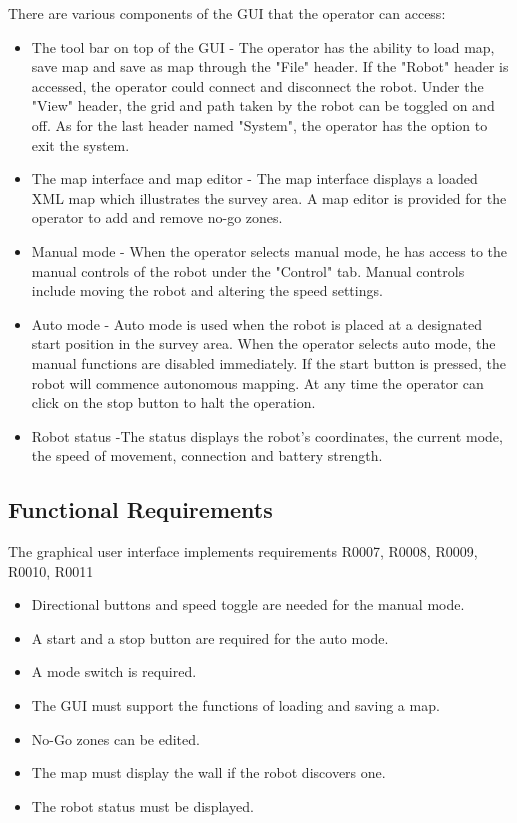 \documentclass[11pt, a4paper]{report}
\begin{document}
There are various components of the GUI that the operator can access:

\begin{itemize}
	\item The tool bar on top of the GUI - The operator has the ability to load map, save map and save as map through the "File" header. If the "Robot" header is accessed, the operator could connect and disconnect the robot. Under the "View" header, the grid and path taken by the robot can be toggled on and off. As for the last header named "System", the operator has the option to exit the system.
	\item The map interface and map editor - The map interface displays a loaded XML map which illustrates the survey area. A map editor is provided for the operator to add and remove no-go zones. 
	\item Manual mode - When the operator selects manual mode, he has access to the manual controls of the robot under the "Control" tab. Manual controls include moving the robot and altering the speed settings. 
	\item  Auto mode - Auto mode is used when the robot is placed at a designated start position in the survey area. When the operator selects auto mode, the manual functions are disabled immediately. If the start button is pressed, the robot will commence autonomous mapping. At any time the operator can click on the stop button to halt the operation. 
	\item Robot status -The status displays the robot's coordinates, the current mode, the speed of movement, connection and battery strength.
\end{itemize}

\subsection{Functional Requirements}

The graphical user interface implements requirements R0007, R0008, R0009, R0010, R0011

\begin{itemize}
	\item Directional buttons and speed toggle are needed for the manual mode.
	\item A start and a stop button are required for the auto mode.
	\item A mode switch is required.
	\item The GUI must support the functions of loading and saving a map.
	\item No-Go zones can be edited.
	\item The map must display the wall if the robot discovers one.
	\item The robot status must be displayed.
\end{itemize}
\end{document}
